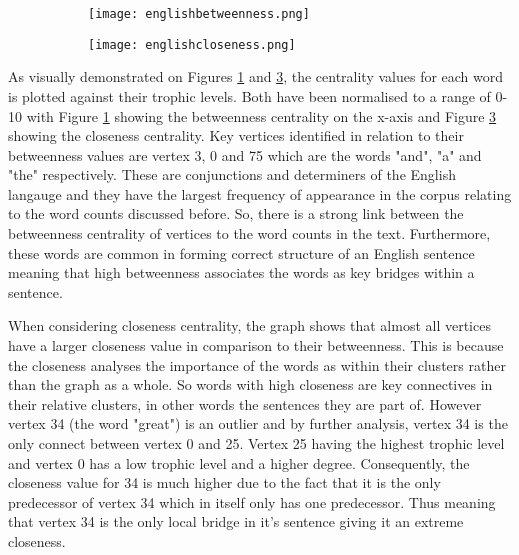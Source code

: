 \begin{figure}[H]
\centering
\begin{subfigure}{.45\textwidth}
	\hspace{-1cm} 
	\texttt{[image: englishbetweenness.png]}
	\caption{}
	\label{fig:engbc}
\end{subfigure}
\hfill
\begin{subfigure}{.45\textwidth}
	\hspace{-1cm} 
	\texttt{[image: englishcloseness.png]}
	\caption{}
	\label{fig:engcc}
\end{subfigure}
\end{figure}

As visually demonstrated on Figures \ref{fig:engbc} and \ref{fig:engcc}, the centrality values for each word is plotted against their trophic levels. Both have been normalised to a range of 0-10 with Figure \ref{fig:engbc} showing the betweenness centrality on the x-axis and Figure \ref{fig:engcc} showing the closeness centrality. Key vertices identified in relation to their betweenness values are vertex 3, 0 and 75 which are the words "and", "a" and "the" respectively. These are conjunctions and determiners of the English langauge and they have the largest frequency of appearance in the corpus relating to the word counts discussed before. So, there is a strong link between the betweenness centrality of vertices to the word counts in the text. Furthermore, these words are common in forming correct structure of an English sentence meaning that high betweenness associates the words as key bridges within a sentence. 

When considering closeness centrality, the graph shows that almost all vertices have a larger closeness value in comparison to their betweenness. This is because the closeness analyses the importance of the words as within their clusters rather than the graph as a whole. So words with high closeness are key connectives in their relative clusters, in other words the sentences they are part of. However vertex 34 (the word "great") is an outlier and by further analysis, vertex 34 is the only connect between vertex 0 and 25. Vertex 25 having the highest trophic level and vertex 0 has a low trophic level and a higher degree. Consequently, the closeness value for 34 is much higher due to the fact that it is the only predecessor of vertex 34 which in itself only has one predecessor. Thus meaning that vertex 34 is the only local bridge in it's sentence giving it an extreme closeness.


